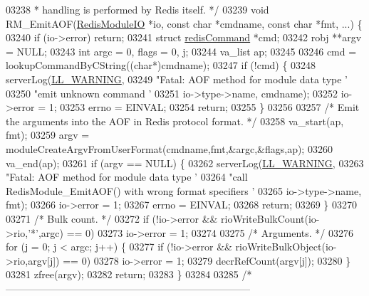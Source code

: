 \begin{DoxyCode}
{{{{{03238 \textcolor{comment}{ * handling is performed by Redis itself. */}
03239 \textcolor{keywordtype}{void} RM\_EmitAOF(\hyperlink{structRedisModuleIO}{RedisModuleIO} *io, \textcolor{keyword}{const} \textcolor{keywordtype}{char} *cmdname, \textcolor{keyword}{const} \textcolor{keywordtype}{char} *fmt, ...) \{
03240     \textcolor{keywordflow}{if} (io->error) \textcolor{keywordflow}{return};
03241     \textcolor{keyword}{struct} \hyperlink{structredisCommand}{redisCommand} *cmd;
03242     robj **argv = NULL;
03243     \textcolor{keywordtype}{int} argc = 0, flags = 0, j;
03244     va\_list ap;
03245 
03246     cmd = lookupCommandByCString((\textcolor{keywordtype}{char}*)cmdname);
03247     \textcolor{keywordflow}{if} (!cmd) \{
03248         serverLog(\hyperlink{server_8h_a31229b9334bba7d6be2a72970967a14b}{LL\_WARNING},
03249             \textcolor{stringliteral}{"Fatal: AOF method for module data type '%
03250             \textcolor{stringliteral}{"emit unknown command '%
03251             io->type->name, cmdname);
03252         io->error = 1;
03253         errno = EINVAL;
03254         \textcolor{keywordflow}{return};
03255     \}
03256 
03257     \textcolor{comment}{/* Emit the arguments into the AOF in Redis protocol format. */}
03258     va\_start(ap, fmt);
03259     argv = moduleCreateArgvFromUserFormat(cmdname,fmt,&argc,&flags,ap);
03260     va\_end(ap);
03261     \textcolor{keywordflow}{if} (argv == NULL) \{
03262         serverLog(\hyperlink{server_8h_a31229b9334bba7d6be2a72970967a14b}{LL\_WARNING},
03263             \textcolor{stringliteral}{"Fatal: AOF method for module data type '%
03264             \textcolor{stringliteral}{"call RedisModule\_EmitAOF() with wrong format specifiers '%
03265             io->type->name, fmt);
03266         io->error = 1;
03267         errno = EINVAL;
03268         \textcolor{keywordflow}{return};
03269     \}
03270 
03271     \textcolor{comment}{/* Bulk count. */}
03272     \textcolor{keywordflow}{if} (!io->error && rioWriteBulkCount(io->rio,\textcolor{stringliteral}{'*'},argc) == 0)
03273         io->error = 1;
03274 
03275     \textcolor{comment}{/* Arguments. */}
03276     \textcolor{keywordflow}{for} (j = 0; j < argc; j++) \{
03277         \textcolor{keywordflow}{if} (!io->error && rioWriteBulkObject(io->rio,argv[j]) == 0)
03278             io->error = 1;
03279         decrRefCount(argv[j]);
03280     \}
03281     zfree(argv);
03282     \textcolor{keywordflow}{return};
03283 \}
03284 
03285 \textcolor{comment}{/* --------------------------------------------------------------------------}
}}}}}}}}}
\end{DoxyCode}

